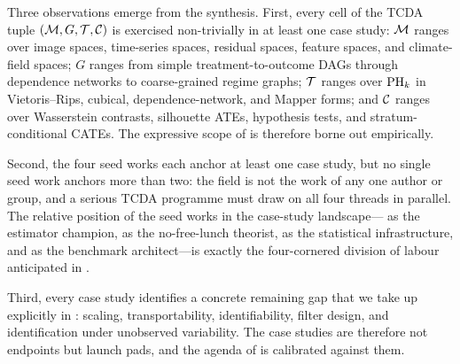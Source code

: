 Three observations emerge from the synthesis. First, every cell of the
TCDA tuple $(\mathcal{M}, G, \mathcal{T}, \mathcal{C})$ is exercised non-trivially in at least
one case study: $\mathcal{M}$ ranges over image spaces, time-series spaces,
residual spaces, feature spaces, and climate-field spaces; $G$ ranges
from simple treatment-to-outcome DAGs through dependence networks to
coarse-grained regime graphs; $\mathcal{T}$ ranges over $\mathrm{PH}_{k}$ in
Vietoris--Rips, cubical, dependence-network, and Mapper forms; and
$\mathcal{C}$ ranges over Wasserstein contrasts, silhouette ATEs, hypothesis
tests, and stratum-conditional CATEs. The expressive scope of
 is therefore borne out empirically.

Second, the four seed works each anchor at least one case study, but no
single seed work anchors more than two: the field is not the work of any
one author or group, and a serious TCDA programme must draw on all four
threads in parallel. The relative position of the seed works in the
case-study landscape---\citet{kim2026topological} as the estimator
champion, \citet{ibeling2021topological} as the no-free-lunch theorist,
\citet{lecci2014statistical} as the statistical infrastructure, and
\citet{elyaagoubi2023statistical} as the benchmark architect---is
exactly the four-cornered division of labour anticipated in
.

Third, every case study identifies a concrete remaining gap that we
take up explicitly in : scaling, transportability,
identifiability, filter design, and identification under unobserved
variability. The case studies are therefore not endpoints but launch
pads, and the agenda of  is calibrated against them.
